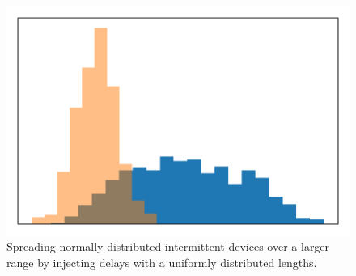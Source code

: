 \begin{figure}
	\centering
		\includegraphics[width=\columnwidth]{figures/spreading.pdf}
	\caption{Spreading normally distributed intermittent devices over a larger range by injecting delays with a uniformly distributed lengths.}
	\label{fig:spreading}
\end{figure}



















